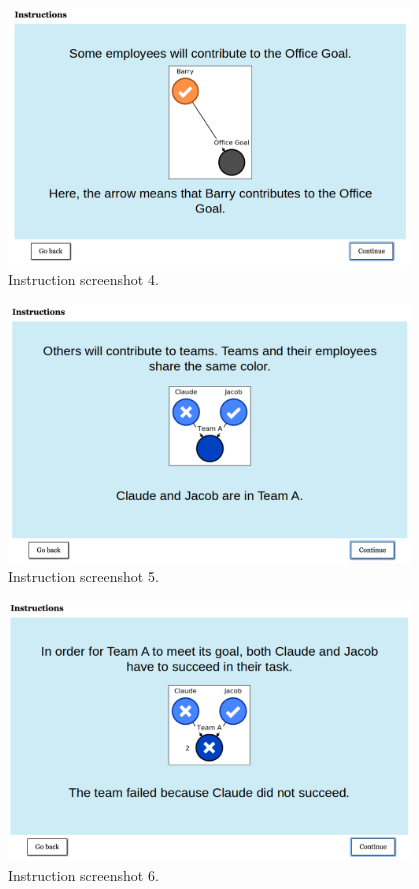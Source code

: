 \documentclass[11pt]{article}
\begin{document}
\begin{figure}[H]
	\centering
	\includegraphics[width=0.95\textwidth]{screenshot_4}
	\caption{Instruction screenshot 4.}
	\label{fig:screenshot_4}
\end{figure}
\begin{figure}[H]
	\centering
	\includegraphics[width=0.95\textwidth]{screenshot_5}
	\caption{Instruction screenshot 5.}
	\label{fig:screenshot_5}
\end{figure}
\begin{figure}[H]
	\centering
	\includegraphics[width=0.95\textwidth]{screenshot_6}
	\caption{Instruction screenshot 6.}
	\label{fig:screenshot_6}
\end{figure}
\end{document}
